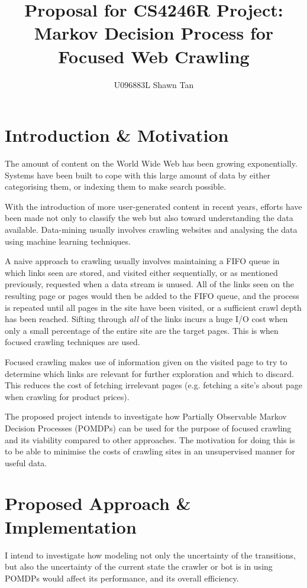 \documentclass{article}
\title{Proposal for CS4246R Project:\\Markov Decision Process for Focused Web Crawling}
\author{U096883L Shawn Tan}
\begin{document}
\maketitle
\section{Introduction \& Motivation}
The amount of content on the World Wide Web has been growing exponentially. Systems have been built to cope with this large amount of data by either categorising them, or indexing them to make search possible.

With the introduction of more user-generated content in recent years, efforts have been made not only to classify the web but also toward understanding the data available. Data-mining usually involves crawling websites and analysing the data using machine learning techniques.

A naive approach to crawling usually involves maintaining a FIFO queue in which links seen are stored, and visited either sequentially, or as mentioned previously, requested when a data stream is unused. All of the links seen on the resulting page or pages would then be added to the FIFO queue, and the process is repeated until all pages in the site have been visited, or a sufficient crawl depth has been reached. Sifting through \emph{all} of the links incurs a huge I/O cost when only a small percentage of the entire site are the target pages. This is when focused crawling techniques are used.

Focused crawling makes use of information given on the visited page to try to determine which links are relevant for further exploration and which to discard. This reduces the cost of fetching irrelevant pages (e.g. fetching a site's about page when crawling for product prices).
 
The proposed project intends to investigate how Partially Observable Markov Decision Processes (POMDPs) can be used for the purpose of focused crawling and its viability compared to other approaches. The motivation for doing this is to be able to minimise the costs of crawling sites in an unsupervised manner for useful data.

\section{Proposed Approach \& Implementation}
I intend to investigate how modeling not only the uncertainty of the transitions, but also the uncertainty of the current state the crawler or bot is in using POMDPs would affect its performance, and its overall efficiency.
\end{document}

